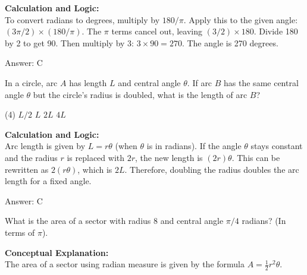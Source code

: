\documentclass[11pt,paper=a4,answers]{exam}
\begin{document}
\begin{questions}
\begin{solution}
\textbf{Calculation and Logic:} \\
To convert radians to degrees, multiply by $180 / \pi$. Apply this to the given angle: $(3\pi / 2) \times (180 / \pi)$. The $\pi$ terms cancel out, leaving $(3/2) \times 180$. Divide 180 by 2 to get 90. Then multiply by 3: $3 \times 90 = 270$. The angle is 270 degrees.

\vspace{30pt}

Answer: \colorbox{yellow!100}{C}
\end{solution}

\vspace{60pt}

\question
In a circle, arc $A$ has length $L$ and central angle $\theta$. If arc $B$ has the same central angle $\theta$ but the circle's radius is doubled, what is the length of arc $B$?
\begin{tasks}(4)
    \task $L/2$
    \task $L$
    \task $2L$
    \task $4L$
\end{tasks}

\begin{solution}
\textbf{Calculation and Logic:} \\
Arc length is given by $L = r\theta$ (when $\theta$ is in radians). If the angle $\theta$ stays constant and the radius $r$ is replaced with $2r$, the new length is $(2r)\theta$. This can be rewritten as $2(r\theta)$, which is $2L$. Therefore, doubling the radius doubles the arc length for a fixed angle.

\vspace{30pt}

Answer: \colorbox{yellow!100}{C}
\end{solution}

\vspace{60pt}

\question
What is the area of a sector with radius 8 and central angle $\pi / 4$ radians? (In terms of $\pi$).

\begin{solution}
\textbf{Conceptual Explanation:} \\
The area of a sector using radian measure is given by the formula $A = \frac{1}{2}r^2\theta$.

\vspace{30pt}


\end{solution}
\end{questions}
\end{document}
